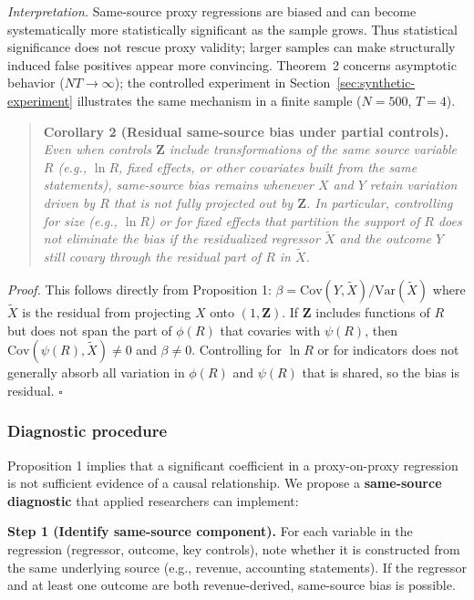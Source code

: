 \noindent\textit{Interpretation.} Same-source proxy regressions are biased and can become systematically more statistically significant as the sample grows. Thus statistical significance does not rescue proxy validity; larger samples can make structurally induced false positives appear more convincing. Theorem~2 concerns asymptotic behavior ($NT \to \infty$); the controlled experiment in Section~\ref{sec:synthetic-experiment} illustrates the same mechanism in a finite sample ($N=500$, $T=4$).

\begin{quote}
\textbf{Corollary 2 (Residual same-source bias under partial controls).} \textit{Even when controls $\mathbf{Z}$ include transformations of the same source variable $R$ (e.g., $\ln R$, fixed effects, or other covariates built from the same statements), same-source bias remains whenever $X$ and $Y$ retain variation driven by $R$ that is not fully projected out by $\mathbf{Z}$. In particular, controlling for size (e.g., $\ln R$) or for fixed effects that partition the support of $R$ does not eliminate the bias if the residualized regressor $\tilde{X}$ and the outcome $Y$ still covary through the residual part of $R$ in $\tilde{X}$.}
\end{quote}

\noindent\textit{Proof.} This follows directly from Proposition 1: $\beta = \mathrm{Cov}(Y, \tilde{X}) / \mathrm{Var}(\tilde{X})$ where $\tilde{X}$ is the residual from projecting $X$ onto $(1, \mathbf{Z})$. If $\mathbf{Z}$ includes functions of $R$ but does not span the part of $\phi(R)$ that covaries with $\psi(R)$, then $\mathrm{Cov}(\psi(R), \tilde{X}) \neq 0$ and $\beta \neq 0$. Controlling for $\ln R$ or for indicators does not generally absorb all variation in $\phi(R)$ and $\psi(R)$ that is shared, so the bias is residual. \hfill $\square$

\subsubsection{Diagnostic procedure}

Proposition 1 implies that a significant coefficient in a proxy-on-proxy regression is not sufficient evidence of a causal relationship. We propose a \textbf{same-source diagnostic} that applied researchers can implement:

\textbf{Step 1 (Identify same-source component).} For each variable in the regression (regressor, outcome, key controls), note whether it is constructed from the same underlying source (e.g., revenue, accounting statements). If the regressor and at least one outcome are both revenue-derived, same-source bias is possible.

